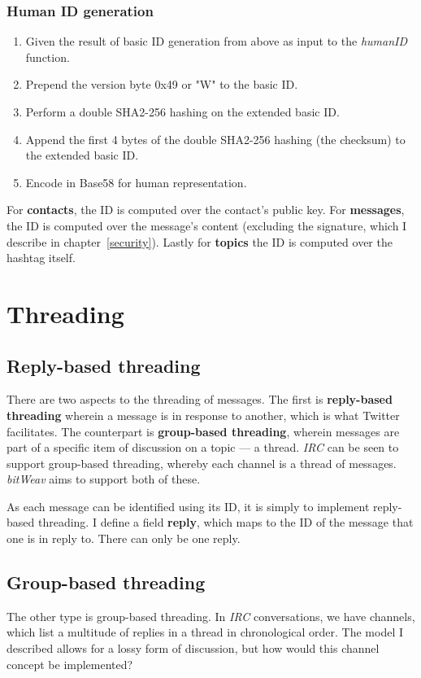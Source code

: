\documentclass[10pt,a4paper,onecolumn]{article}
\begin{document}
\subsubsection*{Human ID generation}
\begin{enumerate}
\item Given the result of basic ID generation from above as input to the \emph{humanID} function.
\item Prepend the version byte 0x49 or "W" to the basic ID.
\item Perform a double SHA2-256 hashing on the extended basic ID.
\item Append the first 4 bytes of the double SHA2-256 hashing (the checksum) to the extended basic ID.
\item Encode in Base58 for human representation. 
\end{enumerate}

For \textbf{contacts}, the ID is computed over the contact's public key. For \textbf{messages}, the ID is computed over the message's content (excluding the signature, which I describe in chapter~\ref{security}). Lastly for \textbf{topics} the ID is computed over the hashtag itself.

\section{Threading}
\subsection*{Reply-based threading}
There are two aspects to the threading of messages. The first is \textbf{reply-based threading} wherein a message is in response to another, which is what Twitter facilitates. The counterpart is \textbf{group-based threading}, wherein messages are part of a specific item of discussion on a topic — a thread. \textit{IRC} can be seen to support group-based threading, whereby each channel is a thread of messages. \textit{bitWeav} aims to support both of these. 

As each message can be identified using its ID, it is simply to implement reply-based threading. I define a field \textbf{reply}, which maps to the ID of the message that one is in reply to. There can only be one reply. 

\subsection*{Group-based threading}
The other type is group-based threading. In \textit{IRC} conversations, we have channels, which list a multitude of replies in a thread in chronological order. The model I described allows for a lossy form of discussion, but how would this channel concept be implemented? 
\end{document}
